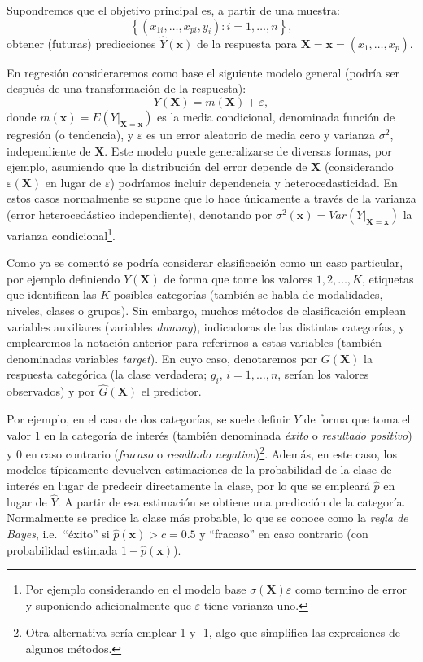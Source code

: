 \documentclass[
]{book}
\theoremstyle{break}
\theoremstyle{definition}
\theoremstyle{definition}
\theoremstyle{definition}
\theoremstyle{definition}
\theoremstyle{remark}
\begin{document}
Supondremos que el objetivo principal es, a partir de una muestra:
\[\left\{ \left( x_{1i}, \ldots, x_{pi}, y_{i} \right)  : i = 1, \ldots, n \right\},\]
obtener (futuras) predicciones \(\hat Y\left(\mathbf{x} \right)\) de la respuesta para \(\mathbf{X}=\mathbf{x}=\left(x_{1}, \ldots, x_{p}\right)\).

En regresión consideraremos como base el siguiente modelo general (podría ser después de una transformación de la respuesta):
\begin{equation} 
  Y(\mathbf{X})=m(\mathbf{X})+\varepsilon,
  \label{eq:modelogeneral}
\end{equation}
donde \(m(\mathbf{x}) = E\left( \left. Y\right\vert_{\mathbf{X}=\mathbf{x}} \right)\) es la media condicional, denominada función de regresión (o tendencia), y \(\varepsilon\) es un error aleatorio de media cero y varianza \(\sigma^2\), independiente de \(\mathbf{X}\).
Este modelo puede generalizarse de diversas formas, por ejemplo, asumiendo que la distribución del error depende de \(\mathbf{X}\) (considerando \(\varepsilon(\mathbf{X})\) en lugar de \(\varepsilon\)) podríamos incluir dependencia y heterocedasticidad.
En estos casos normalmente se supone que lo hace únicamente a través de la varianza (error heterocedástico independiente), denotando por \(\sigma^2(\mathbf{x}) = Var\left( \left. Y\right\vert_{\mathbf{X}=\mathbf{x}} \right)\) la varianza condicional\footnote{Por ejemplo considerando en el modelo base \(\sigma(\mathbf{X})\varepsilon\) como termino de error y suponiendo adicionalmente que \(\varepsilon\) tiene varianza uno.}.

Como ya se comentó se podría considerar clasificación como un caso particular, por ejemplo definiendo \(Y\left(\mathbf{X} \right)\) de forma que tome los valores \(1, 2, \ldots, K\), etiquetas que identifican las \(K\) posibles categorías (también se habla de modalidades, niveles, clases o grupos).
Sin embargo, muchos métodos de clasificación emplean variables auxiliares (variables \emph{dummy}), indicadoras de las distintas categorías, y emplearemos la notación anterior para referirnos a estas variables (también denominadas variables \emph{target}). En cuyo caso, denotaremos por \(G \left(\mathbf{X} \right)\) la respuesta categórica (la clase verdadera; \(g_i\), \(i =1, \ldots, n\), serían los valores observados) y por \(\hat G \left(\mathbf{X} \right)\) el predictor.

Por ejemplo, en el caso de dos categorías, se suele definir \(Y\) de forma que toma el valor 1 en la categoría de interés (también denominada \emph{éxito} o \emph{resultado positivo}) y 0 en caso contrario (\emph{fracaso} o \emph{resultado negativo})\footnote{Otra alternativa sería emplear 1 y -1, algo que simplifica las expresiones de algunos métodos.}.
Además, en este caso, los modelos típicamente devuelven estimaciones de la probabilidad de la clase de interés en lugar de predecir directamente la clase, por lo que se empleará \(\hat p\) en lugar de \(\hat Y\).
A partir de esa estimación se obtiene una predicción de la categoría.
Normalmente se predice la clase más probable, lo que se conoce como la \emph{regla de Bayes}, i.e.~``éxito'' si \(\hat p(\mathbf{x}) > c = 0.5\) y ``fracaso'' en caso contrario (con probabilidad estimada \(1 - \hat p(\mathbf{x})\)).
\end{document}

